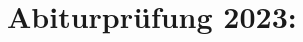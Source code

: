 \documentclass[12pt,fleqn]{../exam2e}
\begin{document}


\pointsdroppedatright

\renewcommand{\thesubpart}{\arabic{subpart}}%
\renewcommand{\subpartlabel}{\thequestion.\thepartno.\thesubpart}

\makeatletter
{}
\makeatother


\section*{Abiturprüfung 2023:}
\end{document}
